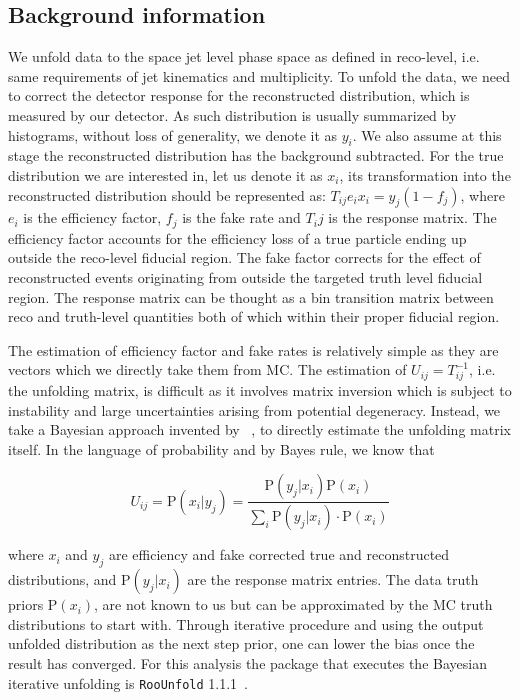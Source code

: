 \subsection{Background information}
\label{sec:gbb-unfoldingintro}

We unfold data to the space jet level phase space as defined in reco-level, i.e. same requirements of jet kinematics and multiplicity. To unfold the data, we need to correct the detector response for the reconstructed distribution, which is measured by our detector. As such distribution is usually summarized by histograms, without loss of generality, we denote it as $y_i$. We also assume at this stage the reconstructed distribution has the background subtracted. For the true distribution we are interested in, let us denote it as $x_i$, its transformation into the reconstructed distribution should be represented as: $T_{ij}e_ix_i = y_j (1-f_j)$, where $e_i$ is the efficiency factor, $f_j$ is the fake rate and $T_ij$ is the response matrix. The efficiency factor accounts for the efficiency loss of a true particle ending up outside the reco-level fiducial region. The fake factor corrects for the effect of reconstructed events originating from outside the targeted truth level fiducial region. The response matrix can be thought as a bin transition matrix between reco and truth-level quantities both of which within their proper fiducial region.

The estimation of efficiency factor and fake rates is relatively simple as they are vectors which we directly take them from MC. The estimation of $U_{ij}=T_{ij}^{-1}$, i.e. the unfolding matrix, is difficult as it involves matrix inversion which is subject to instability and large uncertainties arising from potential degeneracy. Instead, we take a Bayesian approach invented by ~\cite{D'Agostini:1994zf}, to directly estimate the unfolding matrix itself. In the language of probability and by Bayes rule, we know that

\begin{equation}
  U_{ij} = \mathrm{P}(x_i|y_j) = \frac{\mathrm{P}(y_j|x_i)\mathrm{P}(x_i)}{\sum_i \mathrm{P}(y_j|x_i)\cdot \mathrm{P}(x_i)}
  \label{eqn:unfolding:final}
\end{equation}

where $x_i$ and $y_j$ are efficiency and fake corrected true and reconstructed distributions, and $\mathrm{P}(y_j|x_i)$ are the response matrix entries. The data truth priors $\mathrm{P}(x_i)$, are not known to us but can be approximated by the MC truth distributions to start with. Through iterative procedure and using the output unfolded distribution as the next step prior, one can lower the bias once the result has converged. For this analysis the package that executes the Bayesian iterative unfolding is \texttt{RooUnfold} 1.1.1~\cite{Adye:2011gm}.

